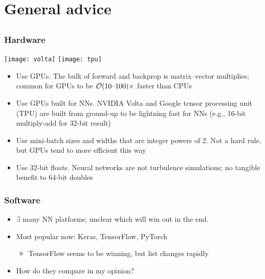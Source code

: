 \section[Advice]{General advice}

\subsection{}

\begin{frame}
    \frametitle{Hardware}
    \texttt{[image: volta]}
    \hfill
    \texttt{[image: tpu]}

    \begin{itemize}[<+->]
        \item \alert{Use GPUs.}
        The bulk of forward and backprop is matrix--vector multiplies; common for GPUs to be $\mathcal{O}(10 \text{--} 100)\times$ faster than CPUs
        \item \alert{Use GPUs built for NNs.}
        NVIDIA Volta and Google tensor processing unit (TPU) are built from ground-up to be lightning fast for NNs (e.g., 16-bit multiply-add for 32-bit result)
        \item \alert{Use mini-batch sizes and widths that are integer powers of 2.}
        Not a hard rule, but GPUs tend to more efficient this way
        \item \alert{Use 32-bit floats.}
        Neural networks are not turbulence simulations; no tangible benefit to 64-bit doubles
    \end{itemize}
\end{frame}

\begin{frame}
    \frametitle{Software}
    \begin{itemize}
        \item $\exists$ many NN platforms; unclear which will win out in the end.
        \item Most popular now: Keras, TensorFlow, PyTorch
        \begin{itemize}
            \item TensorFlow seems to be winning, but list changes rapidly
        \end{itemize}
        \pause
        \item How do they compare in my opinion?
    \end{itemize}

    \begin{center}
        
    \end{center}
\end{frame}

